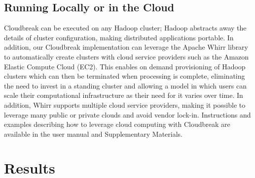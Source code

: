 \documentclass{bioinfo}
\begin{document}
\begin{methods}
\subsection{Running Locally or in the Cloud}

Cloudbreak can be executed on any Hadoop cluster; Hadoop abstracts away the details of cluster configuration, making distributed applications portable. In addition, our Cloudbreak implementation can leverage the Apache Whirr library to automatically create clusters with cloud service providers such as the Amazon Elastic Compute Cloud (EC2). This enables on demand provisioning of Hadoop clusters which can then be terminated when processing is complete, eliminating the need to invest in a standing cluster and allowing a model in which users can scale their computational infrastructure as their need for it varies over time. In addition, Whirr supports multiple cloud service providers, making it possible to leverage many public or private clouds and avoid vendor lock-in. Instructions and examples describing how to leverage cloud computing with Cloudbreak are available in the user manual and Supplementary Materials.


\end{methods}



\section{Results}
\end{document}
